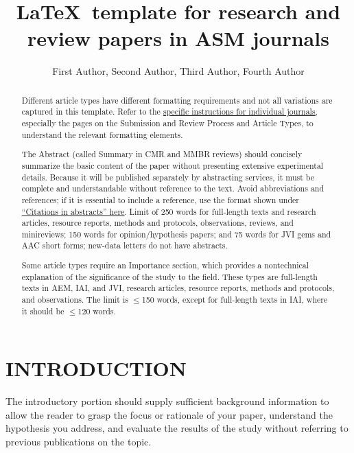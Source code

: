 \documentclass{asmarticle}
\title{\LaTeX\ template for research and review papers in ASM journals}
\author{First Author,\afn{1} Second Author,\afn{2} Third Author,\afn{3} Fourth Author\afn{1,2*}}
\affil{Division, Department, University Name, City, State or Province, Country}
\affil{Company Name, City, State or Province, Country}
\affil{Department, Institution Name, City, State or Province, Country}
\begin{document}
\maketitle

\begin{abstract}%
Different article types have different formatting requirements and not all variations are captured in this template. Refer to the \href{https://journals.asm.org/links-to-journal-author-instructions}{\underline{specific instructions for individual journals}}, especially the pages on the Submission and Review Process and Article Types, to understand the relevant formatting elements.


The Abstract (called Summary in CMR and MMBR reviews) should concisely summarize the basic content of the paper without presenting extensive experimental details. Because it will be published separately by abstracting services, it must be complete and understandable without reference to the text. Avoid abbreviations and references; if it is essential to include a reference, use the format shown under \href{https://journals.asm.org/references}{\underline{``Citations in abstracts'' here}}. Limit of 250 words for full-length texts and research articles, resource reports, methods and protocols, observations, reviews, and minireviews; 150 words for opinion/hypothesis papers; and 75 words for JVI gems and AAC short forms; new-data letters do not have abstracts.  

\begin{importance}%
Some article types require an Importance section, which provides a nontechnical explanation of the significance of the study to the field. These types are full-length texts in AEM, IAI, and JVI, research articles, resource reports, methods and protocols, and observations. The limit is $\leq$150 words, except for full-length texts in IAI, where it should be $\leq$120 words.
\end{importance}
\end{abstract}

\section{INTRODUCTION}
	The introductory portion should supply sufficient background information to allow the reader to grasp the focus or rationale of your paper, understand the hypothesis you address, and evaluate the results of the study without referring to previous publications on the topic.
\end{document}
